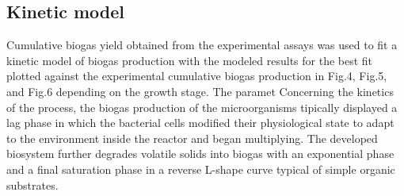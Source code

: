 \subsection{Kinetic model}
Cumulative biogas yield obtained from the experimental assays was used to fit a kinetic model of biogas production with the modeled results for the best fit plotted against the experimental cumulative biogas production in Fig.4, Fig.5, and Fig.6 depending on the growth stage. The paramet
Concerning the kinetics of the process, the biogas production of the microorganisms tipically displayed a lag phase in which the bacterial cells modified their physiological state to adapt to the environment inside the reactor and began multiplying. The developed biosystem further degrades volatile solids into biogas with an exponential phase and a final saturation phase in a reverse L-shape curve typical of simple organic substrates.  